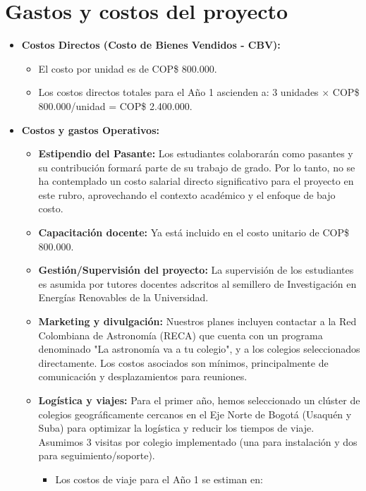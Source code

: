 \section{Gastos y costos del proyecto} 

\begin{itemize}
    \item \textbf{Costos Directos (Costo de Bienes Vendidos - CBV):}
    \begin{itemize}
        \item El costo por unidad es de COP\$ 800.000.
        \item Los costos directos totales para el Año 1 ascienden a: 
					3 unidades $\times$ COP\$ 800.000/unidad = COP\$ 2.400.000.
    \end{itemize}
    \item \textbf{Costos y gastos Operativos:}
    \begin{itemize}
        \item \textbf{Estipendio del Pasante:} Los estudiantes colaborarán como 
					pasantes y su contribución formará parte de su trabajo de grado. Por 
					lo tanto, no se ha contemplado un costo salarial directo 
					significativo para el proyecto en este rubro, aprovechando el 
					contexto académico y el enfoque de bajo costo.
        \item \textbf{Capacitación docente:} Ya está incluido en el costo 
					unitario de COP\$ 800.000.
        \item \textbf{Gestión/Supervisión del proyecto:} La supervisión de los 
					estudiantes es asumida por tutores docentes adscritos al semillero de 
					Investigación en Energías Renovables de la Universidad.
        \item \textbf{Marketing y divulgación:} Nuestros planes incluyen 
					contactar a la Red Colombiana de Astronomía (RECA) que cuenta con un 
					programa denominado "La astronomía va a tu colegio", y a los colegios 
					seleccionados directamente. Los costos asociados son mínimos, 
					principalmente de comunicación y desplazamientos para reuniones.
        \item \textbf{Logística y viajes:} Para el primer año, hemos 
					seleccionado un clúster de colegios geográficamente cercanos en el 
					Eje Norte de Bogotá (Usaquén y Suba) para optimizar la logística y 
					reducir los tiempos de viaje. Asumimos 3 visitas por colegio 
					implementado (una para instalación y dos para seguimiento/soporte).
        \begin{itemize}
            \item Los costos de viaje para el Año 1 se estiman en: 

\end{itemize}
\end{itemize}
\end{itemize}
